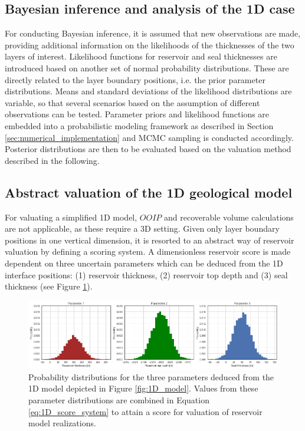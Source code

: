 			\subsection{Bayesian inference and analysis of the 1D case}\label{sec:1D_bayes}
			For conducting Bayesian inference, it is assumed that new observations are made, providing additional information on the likelihoods of the thicknesses of the two layers of interest. Likelihood functions for reservoir and seal thicknesses are introduced based on another set of normal probability distributions. These are directly related to the layer boundary positions, i.e. the prior parameter distributions. Means and standard deviations of the likelihood distributions are variable, so that several scenarios based on the assumption of different observations can be tested. Parameter priors and likelihood functions are embedded into a probabilistic modeling framework as described in Section \ref{sec:numerical_implementation} and MCMC sampling is conducted accordingly. Posterior distributions are then to be evaluated based on the valuation method described in the following.
			
	        \subsection{Abstract valuation of the 1D geological model}\label{sec:1D_score_system}
	        For valuating a simplified 1D model, $OOIP$ and recoverable volume calculations are not applicable, as these require a 3D setting. Given only layer boundary positions in one vertical dimension, it is resorted to an abstract way of reservoir valuation by defining a scoring system. A dimensionless reservoir score is made dependent on three uncertain parameters which can be deduced from the 1D interface positions: (1) reservoir thickness, (2) reservoir top depth and (3) seal thickness (see Figure \ref{fig:3_parameters}).
	        	
	        \begin{figure}[h]
	        	\centering
	        	\includegraphics[width=1\textwidth]{Figures/3_parameters.png}
	        	\caption{Probability distributions for the three parameters deduced from the 1D model depicted in Figure \ref{fig:1D_model}. Values from these parameter distributions are combined in Equation \ref{eq:1D_score_system} to attain a score for valuation of reservoir model realizations.}\label{fig:3_parameters}
	        \end{figure}
	        

